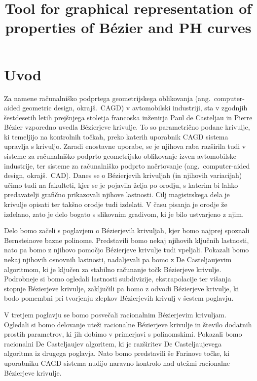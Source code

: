 \documentclass[isrm2, tisk]{fmfdelo}
\title{Tool for graphical representation of properties of Bézier and PH curves}
\begin{document}
    \section{Uvod}
    Za namene računalniško podprtega geometrijskega oblikovanja (ang.\ computer-aided geometric design, okrajš.\ CAGD) v avtomobilski industriji, sta v zgodnjih šestdesetih letih prejšnjega stoletja francoska inženirja Paul de Casteljau in Pierre Bézier vzporedno uvedla Bézierjeve krivulje.
    To so parametrično podane krivulje, ki temeljijo na kontrolnih točkah, preko katerih uporabnik CAGD sistema upravlja s krivuljo.
    Zaradi enostavne uporabe, se je njihova raba razširila tudi v sisteme za računalniško podprto geometrijsko oblikovanje izven avtomobilske industrije, ter sisteme za računalniško podprto načrtovanje (ang.\ computer-aided design, okrajš.\ CAD).
    Danes se o Bézierjevih krivuljah (in njihovih variacijah) učimo tudi na fakulteti, kjer se je pojavila želja po orodju, s katerim bi lahko predavatelji grafično prikazovali njihove lastnosti.
    Cilj magistrskega dela je krivulje opisati ter takšno orodje tudi izdelati.
    V času pisanja je orodje že izdelano, zato je delo bogato s slikovnim gradivom, ki je bilo ustvarjeno z njim.

    Delo bomo začeli s poglavjem o Bézierjevih krivuljah, kjer bomo najprej spoznali Bernsteinove bazne polinome.
    Predstavili bomo nekaj njihovih ključnih lastnosti, nato pa bomo z njihovo pomočjo Bézierjeve krivulje tudi vpeljali.
    Pokazali bomo nekaj njihovih osnovnih lastnosti, nadaljevali pa bomo z De Casteljaujevim algoritmom, ki je ključen za stabilno računanje točk Bézierjeve krivulje.
    Podrobneje si bomo ogledali lastnosti subdivizije, ekstrapolacije ter višanja stopnje Bézierjeve krivulje, zaključili pa bomo z odvodi Bézierjeve krivulje, ki bodo pomembni pri tvorjenju zlepkov Bézierjevih krivulj v šestem poglavju.

    V tretjem poglavju se bomo posvečali racionalnim Bézierjevim krivuljam.
    Ogledali si bomo delovanje uteži racionalne Bézierjeve krivulje in število dodatnih prostih parametrov, ki jih dobimo v primerjavi s polinomskimi.
    Pokazali bomo racionalni De Casteljaujev algoritem, ki je razširitev De Casteljaujevega algoritma iz drugega poglavja.
    Nato bomo predstavili še Farinove točke, ki uporabniku CAGD sistema nudijo naravno kontrolo nad utežmi racionalne Bézierjeve krivulje.
\end{document}
